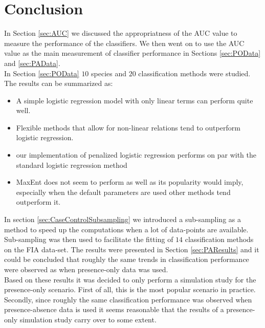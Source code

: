 \section{Conclusion}
In Section \ref{sec:AUC} we discussed the appropriatness of the AUC value to measure the performance of the classifiers. We then went on to use the AUC value as the main measurement of classifier performance in Sections \ref{sec:POData} and \ref{sec:PAData}. \\

In Section \ref{sec:POData} $10$ species and $20$ classification methods were studied. The results can be summarized as:
\begin{itemize}
\item A simple logistic regression model with only linear terms can perform quite well.
\item Flexible methods that allow for non-linear relations tend to outperform logistic regression.
\item our implementation of penalized logistic regression performs on par with the standard logistic regression method
\item MaxEnt does not seem to perform as well as its popularity would imply, especially when the default parameters are used other methods tend outperform it.
\end{itemize}

In section \ref{sec:CaseControlSubsampling} we introduced a sub-sampling as a method to speed up the computations when a lot of data-points are available. Sub-sampling was then used to facilitate the fitting of $14$ classification methods on the FIA data-set. The results were presented in Section \ref{sec:PAResults} and it could be concluded that roughly the same trends in classification performance were observed as when presence-only data was used. \\

Based on these results it was decided to only perform a simulation study for the presence-only scenario. First of all, this is the most popular scenario in practice. Secondly, since roughly the same classification performance was observed when presence-absence data is used it seems reasonable that the results of a presence-only simulation study carry over to some extent.




